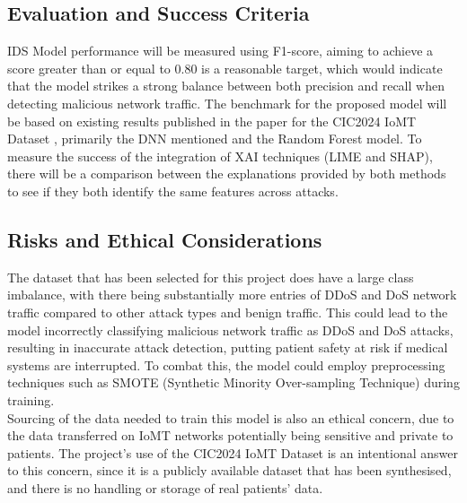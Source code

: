 \documentclass[11pt,a4paper]{article}
\begin{document}
\subsection{Evaluation and Success Criteria}
IDS Model performance will be measured using F1-score, aiming to achieve a score greater than or equal to 0.80 is a reasonable target, which would indicate that the model strikes a strong balance between both precision and recall when detecting malicious network traffic.
The benchmark for the proposed model will be based on existing results published in the paper for the CIC2024 IoMT Dataset \cite{dadkhah2024ciciomt2024}, primarily the DNN mentioned and the Random Forest model.
To measure the success of the integration of XAI techniques (LIME and SHAP), there will be a comparison between the explanations provided by both methods to see if they both identify the same features across attacks. 

\subsection{Risks and Ethical Considerations}
The dataset that has been selected for this project does have a large class imbalance, with there being substantially more entries of DDoS and DoS network traffic compared to other attack types and benign traffic. This could lead to the model incorrectly classifying malicious network traffic as DDoS and DoS attacks, resulting in inaccurate attack detection, putting patient safety at risk if medical systems are interrupted. To combat this, the model could employ preprocessing techniques such as SMOTE (Synthetic Minority Over-sampling Technique) during training.
\\
Sourcing of the data needed to train this model is also an ethical concern, due to the data transferred on IoMT networks potentially being sensitive and private to patients. The project’s use of the CIC2024 IoMT Dataset is an intentional answer to this concern, since it is a publicly available dataset that has been synthesised, and there is no handling or storage of real patients’ data.

\newpage



\end{document}

